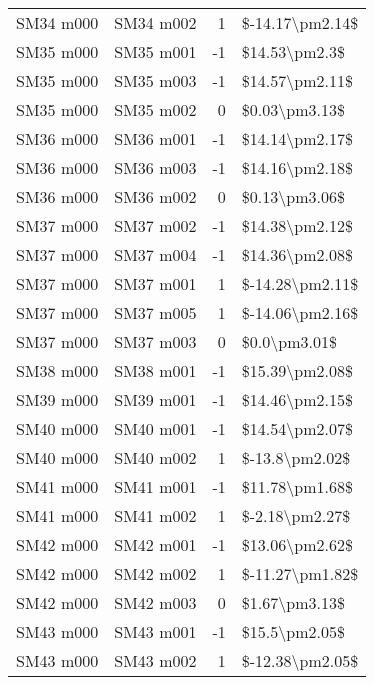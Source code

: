 \begin{longtable}{llrl}
 SM34 m000 &     SM34 m002 &       1 &  \$-14.17\textbackslash pm2.14\$ \\
 SM35 m000 &     SM35 m001 &      -1 &    \$14.53\textbackslash pm2.3\$ \\
 SM35 m000 &     SM35 m003 &      -1 &   \$14.57\textbackslash pm2.11\$ \\
 SM35 m000 &     SM35 m002 &       0 &    \$0.03\textbackslash pm3.13\$ \\
 SM36 m000 &     SM36 m001 &      -1 &   \$14.14\textbackslash pm2.17\$ \\
 SM36 m000 &     SM36 m003 &      -1 &   \$14.16\textbackslash pm2.18\$ \\
 SM36 m000 &     SM36 m002 &       0 &    \$0.13\textbackslash pm3.06\$ \\
 SM37 m000 &     SM37 m002 &      -1 &   \$14.38\textbackslash pm2.12\$ \\
 SM37 m000 &     SM37 m004 &      -1 &   \$14.36\textbackslash pm2.08\$ \\
 SM37 m000 &     SM37 m001 &       1 &  \$-14.28\textbackslash pm2.11\$ \\
 SM37 m000 &     SM37 m005 &       1 &  \$-14.06\textbackslash pm2.16\$ \\
 SM37 m000 &     SM37 m003 &       0 &     \$0.0\textbackslash pm3.01\$ \\
 SM38 m000 &     SM38 m001 &      -1 &   \$15.39\textbackslash pm2.08\$ \\
 SM39 m000 &     SM39 m001 &      -1 &   \$14.46\textbackslash pm2.15\$ \\
 SM40 m000 &     SM40 m001 &      -1 &   \$14.54\textbackslash pm2.07\$ \\
 SM40 m000 &     SM40 m002 &       1 &   \$-13.8\textbackslash pm2.02\$ \\
 SM41 m000 &     SM41 m001 &      -1 &   \$11.78\textbackslash pm1.68\$ \\
 SM41 m000 &     SM41 m002 &       1 &   \$-2.18\textbackslash pm2.27\$ \\
 SM42 m000 &     SM42 m001 &      -1 &   \$13.06\textbackslash pm2.62\$ \\
 SM42 m000 &     SM42 m002 &       1 &  \$-11.27\textbackslash pm1.82\$ \\
 SM42 m000 &     SM42 m003 &       0 &    \$1.67\textbackslash pm3.13\$ \\
 SM43 m000 &     SM43 m001 &      -1 &    \$15.5\textbackslash pm2.05\$ \\
 SM43 m000 &     SM43 m002 &       1 &  \$-12.38\textbackslash pm2.05\$ \\

\end{longtable}
